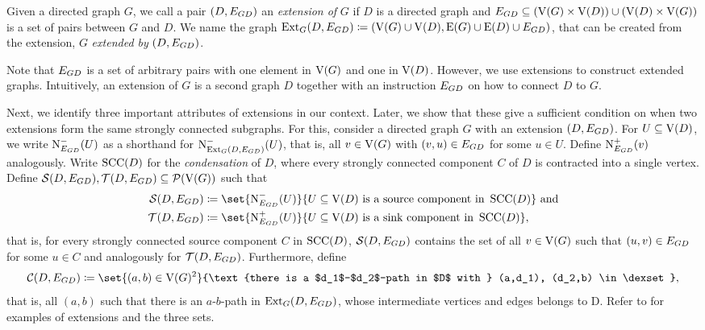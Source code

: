 \begin{theorem}
\begin{lemma}
\begin{theorem}
\begin{definition}[Extension]
Given a directed graph $G$, we call a pair $({D}, E_{{G}{D}})$ an \emph{extension of} $G$ if $D$ is a directed graph and $E_{{G}{D}} \subseteq (\operatorname{V}({G}) \times \operatorname{V}({D})) \cup (\operatorname{V}({D}) \times \operatorname{V}({G}))$ is a set of pairs between $G$ and $D$. 
We name the graph $\operatorname{\textrm{Ext}}_{G}({D}, {E_{{G}{D}}}) \coloneqq (\operatorname{V}({G}) \cup \operatorname{V}({D}), \operatorname{E}({G}) \cup \operatorname{E}({D}) \cup E_{{G}{D}})$, that can be created from the extension, $G$ \emph{extended by} $({D}, E_{{G}{D}})$.
\end{definition}

Note that $E_{{G}{D}}$ is a set of arbitrary pairs with one element in $\operatorname{V}({G})$ and one in $\operatorname{V}({D})$. However, we use extensions to construct extended graphs.
Intuitively, an extension of $G$ is a second graph $D$ together with an instruction $E_{{G}{D}}$ on how to connect $D$ to $G$.

Next, we identify three important attributes of extensions in our context. Later, we show that these give a sufficient condition on when two extensions form the same strongly connected subgraphs.
  For this, consider a directed graph $G$ with an extension $({D}, E_{{G}{D}})$. For $U \subseteq \operatorname{V}({D})$, we write $\operatorname{N}^{-}_{E_{{G}{D}}}({U})$ as a shorthand for $\operatorname{N}^{-}_{\operatorname{\textrm{Ext}}_{G}({D}, {E_{{G}{D}}})}({U})$, that is, all $v \in \operatorname{V}({G})$ with $(v,u) \in E_{{G}{D}}$ for some $u \in U$. Define $\operatorname{N}^+_{E_{{G}{D}}}({v})$ analogously.
  Write $\operatorname{\textrm{SCC}}({D})$ for the \emph{condensation} of $D$, where every strongly connected component $C$ of $D$ is contracted into a single vertex.
  Define $\operatorname{\mathcal{S}}({D}, {E_{{G}{D}}}), \operatorname{\mathcal{T}}({D}, {E_{{G}{D}}}) \subseteq \mathcal{P}(\operatorname{V}({G}))$ such that 
  \begin{align*}
    \sourcee{D}{\dexset} &\coloneqq \set{\inNeiG{\dexset}{U}}{U \subseteq \ve{D} \text{ is a source component in } \scc{D}} \text{ and}\\
    \sinke{D}{\dexset} &\coloneqq \set{\outNeiG{\dexset}{U}}{U \subseteq \ve{D} \text{ is a sink component in } \scc{D}},
  \end{align*}
  that is, for every strongly connected source component $C$ in $\operatorname{\textrm{SCC}}({D})$, $\operatorname{\mathcal{S}}({D}, {E_{{G}{D}}})$ contains the set of all $v \in \operatorname{V}({G})$ such that $({u}, {v}) \in E_{{G}{D}}$ for some $u \in C$ and analogously for $\operatorname{\mathcal{T}}({D}, {E_{{G}{D}}})$.
%
  Furthermore, define \[\conne{D}{\dexset} \coloneqq \set{(a,b) \in \ve{G}^2}{\text{there is a $d_1$-$d_2$-path in $D$ with } (a,d_1), (d_2,b) \in \dexset}, \] that is, all $(a,b)$ such that there is an $a$-$b$-path in $\operatorname{\textrm{Ext}}_{G}({D}, {E_{{G}{D}}})$, whose intermediate vertices and edges belongs to D. Refer to  for examples of extensions and the three sets.


\end{theorem}
\end{lemma}
\end{theorem}
